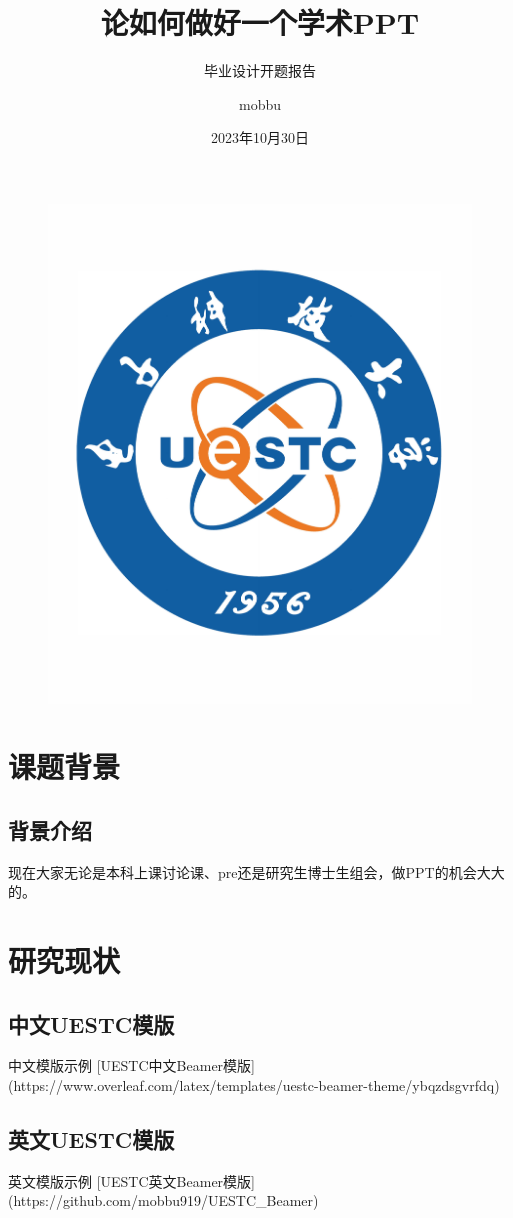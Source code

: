 \documentclass{beamer}
\author{mobbu}
\title{论如何做好一个学术PPT}
\subtitle{毕业设计开题报告}
\institute{电子科技大学牛马学院}
\date{2023年10月30日}
\begin{document}
\kaishu
\begin{frame}
    \titlepage
    \begin{figure}[htpb]
        \begin{center}
            \includegraphics[width=0.2\linewidth]{pic/logo.pdf}
        \end{center}
    \end{figure}
\end{frame}

\begin{frame}
    \tableofcontents[sectionstyle=show,subsectionstyle=show/shaded/hide,subsubsectionstyle=show/shaded/hide]
\end{frame}

\section{课题背景}

\subsection{背景介绍}

现在大家无论是本科上课讨论课、pre还是研究生博士生组会，做PPT的机会大大的。

\section{研究现状}

\subsection{中文UESTC模版}

\begin{frame}{中文模版示例}
[UESTC中文Beamer模版](https://www.overleaf.com/latex/templates/uestc-beamer-theme/ybqzdsgvrfdq)
\end{frame}

\subsection{英文UESTC模版}
\begin{frame}{英文模版示例}
[UESTC英文Beamer模版](https://github.com/mobbu919/UESTC_Beamer)
\end{frame}
\end{document}
